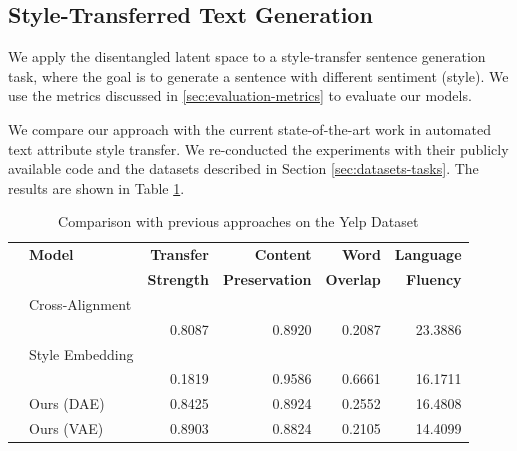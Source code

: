 \subsection{Style-Transferred Text Generation}

We apply the disentangled latent space to a style-transfer sentence generation task, where the goal is to generate a sentence with different sentiment (style). We use the metrics discussed in \ref{sec:evaluation-metrics} to evaluate our models.

We compare our approach with the current state-of-the-art work in automated text attribute style transfer. We re-conducted the experiments with their publicly available code and the datasets described in Section \ref{sec:datasets-tasks}. The results are shown in Table \ref{tab:comparison-previous}.

\begin{table}[ht]
	\centering
	\begin{tabular}{| c | l | r | r | r | r |}
		\hline
		\multirow{2}{*}{} & \textbf{Model}        & \textbf{Transfer} & \textbf{Content}      & \textbf{Word}    & \textbf{Language} \\
		                  &                       & \textbf{Strength} & \textbf{Preservation} & \textbf{Overlap} & \textbf{Fluency}  \\
		\hline
		\hline
		\multirow{2}{*}{} & Cross-Alignment       &                   &                       &                  &                   \\
		                  & \citep{shen2017style} & 0.8087            & 0.8920                & 0.2087           & 23.3886           \\
		\hline
		\multirow{2}{*}{} & Style Embedding       &                   &                       &                  &                   \\
		                  & \citep{fu2017style}   & 0.1819            & 0.9586                & 0.6661           & 16.1711           \\
		\hline
		                  & Ours (DAE)            & 0.8425            & 0.8924                & 0.2552           & 16.4808           \\
		\hline
		                  & Ours (VAE)            & 0.8903            & 0.8824                & 0.2105           & 14.4099           \\
		\hline
	\end{tabular}
	\caption{Comparison with previous approaches on the Yelp Dataset}
	\label{tab:comparison-previous}
\end{table}

